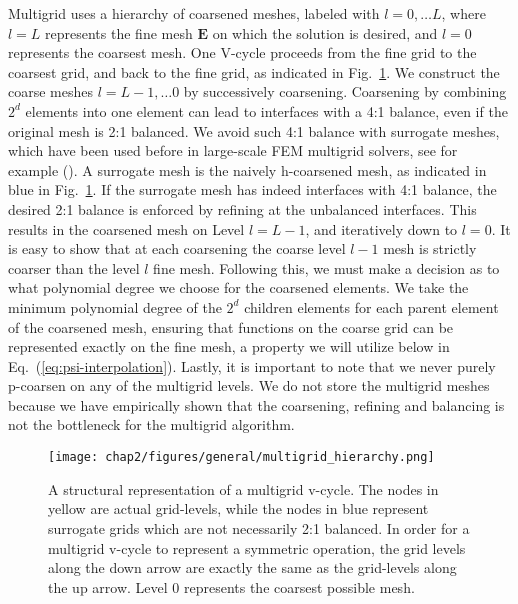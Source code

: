 Multigrid uses a hierarchy of coarsened meshes, labeled with
$l=0, \ldots L$, where $l=L$
represents the fine mesh $\mathbf{E}$ on which the solution is
desired, and $l=0$ represents the coarsest mesh.  One V-cycle proceeds
from the fine grid to the coarsest grid, and back to the fine grid, as
indicated in Fig.~\ref{fig:vcycle}.  We construct the coarse meshes
$l=L-1, \ldots 0$ by successively coarsening. Coarsening by
  combining $2^d$ elements into one element can lead to interfaces
  with a 4:1 balance, even if the original mesh is 2:1 balanced.  We
  avoid such 4:1 balance with
surrogate meshes, which have been used before in large-scale FEM
multigrid solvers, see for example
(\cite{sampath2008dendro,sundar2012parallel}).  A surrogate mesh is the
naively h-coarsened mesh, as indicated in blue in
Fig.~\ref{fig:vcycle}.  If the surrogate mesh has indeed interfaces
with 4:1 balance, the desired 2:1 balance is enforced by refining at
the unbalanced interfaces.  This results in the coarsened mesh on
Level $l=L-1$, and iteratively down to $l=0$.  It is easy to show that
at each coarsening the coarse level $l-1$ mesh is strictly
coarser than the level $l$ fine mesh.  Following this, we must make a decision as to what
polynomial degree we choose for the coarsened elements. We take the minimum polynomial degree of the $2^{d}$
children elements for each parent element of the coarsened mesh, ensuring that functions on the coarse grid can be represented exactly on the fine mesh, a property we will utilize below in Eq.~(\ref{eq:psi-interpolation}). Lastly, it is important to note that we never purely p-coarsen on any of the multigrid levels.
We do not store the multigrid meshes
because we have empirically shown that the coarsening, refining and
balancing is not the bottleneck for the multigrid algorithm.

%
\begin{figure}[ht!]
\texttt{[image: chap2/figures/general/multigrid\_hierarchy.png]}
\caption{
  \label{fig:vcycle}
  A structural representation of a multigrid v-cycle. The nodes in yellow are actual grid-levels, while the nodes in blue represent surrogate grids which are not necessarily 2:1 balanced. In order for a multigrid v-cycle to represent a symmetric operation, the grid levels along the down arrow are exactly the same as the grid-levels along the up arrow. Level 0 represents the coarsest possible mesh.} 
\end{figure}
%

